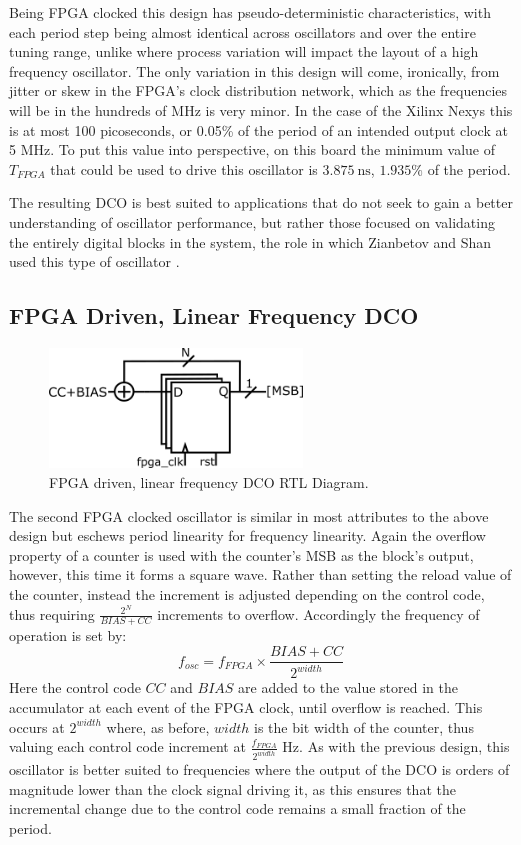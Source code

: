 Being \ac{FPGA} clocked this design has pseudo-deterministic characteristics, with each period step being almost identical across oscillators and over the entire tuning range, unlike  where process variation will impact the layout of a high frequency oscillator. The only variation in this design will come, ironically, from jitter or skew in the \ac{FPGA}'s clock distribution network, which as the frequencies will be in the hundreds of MHz is very minor. In the case of the Xilinx \acl*{Nexys} this is at most 100 picoseconds, or 0.05\% of the period of an intended output clock at 5 MHz. To put this value into perspective, on this board the minimum value of $T_{FPGA}$ that could be used to drive this oscillator is $3.875~\si{\nano\second}$, $1.935\%$ of the period.

The resulting \ac{DCO} is best suited to applications that do not seek to gain a better understanding of oscillator performance, but rather those focused on validating the entirely digital blocks in the system, the role in which Zianbetov and Shan used this type of oscillator \cite{zianbetov2013phd,shan2014phd}.

\subsection{\acs{FPGA} Driven, Linear Frequency \acs{DCO}}
\begin{figure}[h]
	\centering
	\includegraphics[width=0.6\textwidth]{../osc2}
	\caption{\acs{FPGA} driven, linear frequency \acs{DCO} \ac{RTL} Diagram.}
	\label{fig:osc2}
\end{figure}
The second \ac{FPGA} clocked oscillator is similar in most attributes to the above design but eschews period linearity for frequency linearity. Again the overflow property of a counter is used with the counter's \ac{MSB} as the block's output, however, this time it forms a square wave. Rather than setting the reload value of the counter, instead the increment is adjusted depending on the control code, thus requiring $\frac{2^N}{BIAS+CC}$ increments to overflow. Accordingly the frequency of operation is set by:
\begin{equation}
	f_{osc} = f_{FPGA}\times\frac{BIAS+CC}{2^{width}}
\end{equation}
Here the control code $CC$ and $BIAS$ are added to the value stored in the accumulator at each event of the \ac{FPGA} clock, until overflow is reached. This occurs at $2^{width}$ where, as before, $width$ is the bit width of the counter, thus valuing each control code increment at $\frac{f_{FPGA}}{2^{width}}$ Hz. As with the previous design, this oscillator is better suited to frequencies where the output of the \ac{DCO} is orders of magnitude lower than the clock signal driving it, as this ensures that the incremental change due to the control code remains a small fraction of the period.

